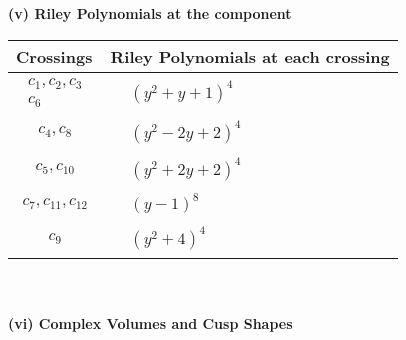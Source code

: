 \documentclass[1p]{elsarticle_modified}
\theoremstyle{definition}
\begin{document}
\newpage\renewcommand{\arraystretch}{1}
\flushleft \textbf{(v) Riley Polynomials at the component}\newline \\
\begin{tabular}{m{50pt}|m{274pt}}
Crossings & \hspace{64pt}Riley Polynomials at each crossing \\
\hline $$\begin{aligned}c_{1},c_{2},c_{3}\\c_{6}\end{aligned}$$&$\begin{aligned}
&(y^2+y+1)^4
\end{aligned}$\\
\hline $$\begin{aligned}c_{4},c_{8}\end{aligned}$$&$\begin{aligned}
&(y^2-2 y+2)^4
\end{aligned}$\\
\hline $$\begin{aligned}c_{5},c_{10}\end{aligned}$$&$\begin{aligned}
&(y^2+2 y+2)^4
\end{aligned}$\\
\hline $$\begin{aligned}c_{7},c_{11},c_{12}\end{aligned}$$&$\begin{aligned}
&(y-1)^8
\end{aligned}$\\
\hline $$\begin{aligned}c_{9}\end{aligned}$$&$\begin{aligned}
&(y^2+4)^4
\end{aligned}$\\
\hline
\end{tabular}\\~\\
\newpage\flushleft \textbf{(vi) Complex Volumes and Cusp Shapes}
\end{document}
